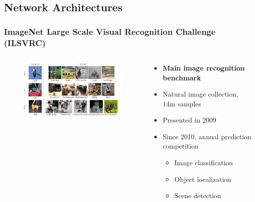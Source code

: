 \documentclass[aspectratio=169]{beamer}
\newcommand\imageright[1]{ %
    \caption*{\scalebox{.5}{\textcolor{lightgray}{\textcopyright~#1}}} %
}
\begin{document}
\subsection{Network Architectures}
\label{subsec:network-architectures}

\begin{frame}
\frametitle{ImageNet Large Scale Visual Recognition Challenge (ILSVRC)}

\begin{columns}
    \begin{column}{0.48\textwidth}
        \begin{figure}
            \includegraphics[width=\linewidth]{ilsvrc.jpg}
            \imageright{Oren Kraus}
        \end{figure}
    \end{column}
    \begin{column}{0.48\textwidth}
        \begin{itemize}
            \item \textbf{Main image recognition benchmark}
            \item Natural image collection, 14m samples
            \item Presented in 2009
            \item Since 2010, annual prediction competition
            \begin{itemize}
                \item Image classification
                \item Object localization
                \item Scene detection
            \end{itemize}
        \end{itemize}
    \end{column}
\end{columns}
\end{frame}
\end{document}
